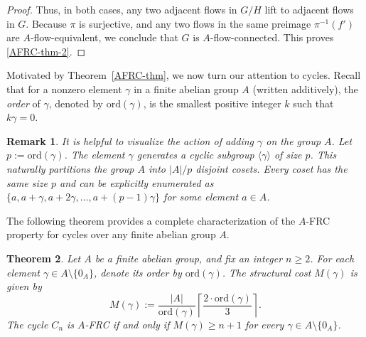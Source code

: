 \documentclass[a4paper,12pt]{article}
\theoremstyle{plain}
\newtheorem{theorem}{Theorem}[section]
\newtheorem{remark}[theorem]{Remark}
\theoremstyle{definition}
\renewcommand\ge\geqslant
\newcommand\ord{\textrm{ord}}
\begin{document}
\begin{proof}
Thus, in both cases, any two adjacent flows in $G/H$ lift to adjacent flows in $G$. Because $\pi$ is surjective, and any two flows in the same preimage $\pi^{-1}(f')$ are $A$-flow-equivalent, we conclude that $G$ is $A$-flow-connected. This proves \ref{AFRC-thm-2}.
\end{proof}

Motivated by Theorem~\ref{AFRC-thm}, we now turn our attention to cycles. 
Recall that for a nonzero element $\gamma$ in a finite abelian group $A$ (written additively), the \emph{order} of $\gamma$, denoted by $\ord(\gamma)$, is the smallest positive integer $k$ such that $k\gamma = 0$. 

\begin{remark}
It is helpful to visualize the action of adding $\gamma$ on the group $A$. 
Let $p:=\ord(\gamma)$.
The element $\gamma$ generates a cyclic subgroup $\langle \gamma \rangle$ of size $p$. This naturally partitions the group $A$ into $|A|/p$ disjoint cosets. Every coset has the same size $p$ and can be explicitly enumerated as $\{a, a+\gamma, a+2\gamma, \dots, a+(p-1)\gamma\}$ for some element $a \in A$.
\end{remark}

The following theorem provides a complete characterization of the $A$-FRC property for cycles over any finite abelian group $A$.

\begin{theorem}\label{thm:universal-FRC}
Let $A$ be a finite abelian group, 
and fix an integer $n \ge 2$. 
For each element $\gamma \in A \setminus \{0_A\}$, denote its order by $\ord(\gamma)$. The \emph{structural cost} $M(\gamma)$ is given by 
\[ M(\gamma):= \frac{|A|}{\ord(\gamma)} \left\lceil \frac{2 \cdot \ord(\gamma)}{3} \right\rceil. \]
The cycle $C_n$ is $A$-FRC if and only if $M(\gamma) \ge n + 1$ for every $\gamma \in A \setminus \{0_A\}$.
\end{theorem}
\end{document}

